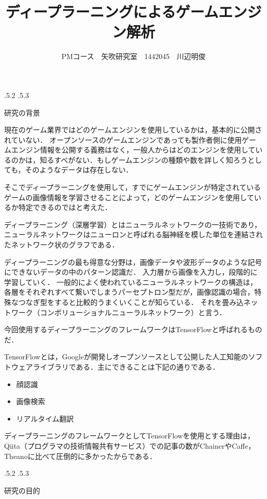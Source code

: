 \documentclass[uplatex]{jsarticle}
\title{\vspace{-14mm}ディープラーニングによるゲームエンジン解析}
\author{PMコース　矢吹研究室　1442045　川辺明俊}
\date{}%
\makeatletter
\renewcommand{\section}{%
    \if@slide\clearpage\fi
    \@startsection{section}{1}{\z@}%
    {\Cvs \@plus.5\Cdp \@minus.2\Cdp}%
    {.5\Cvs \@plus.3\Cdp}%
    {\normalfont\raggedright}}
\makeatother
\begin{document}
\maketitle

\section{研究の背景}

現在のゲーム業界ではどのゲームエンジンを使用しているかは，基本的に公開されていない．
オープンソースのゲームエンジンであっても製作者側に使用ゲームエンジン情報を公開する義務はなく，一般人からはどのエンジンを使用しているのかは，知るすべがない．もしゲームエンジンの種類や数を詳しく知ろうとしても，そのようなデータは存在しない．

そこでディープラーニングを使用して，すでにゲームエンジンが特定されているゲームの画像情報を学習させることによって，どのゲームエンジンを使用しているか特定できるのではと考えた．

ディープラーニング（深層学習）とはニューラルネットワークの一技術であり，ニューラルネットワークはニューロンと呼ばれる脳神経を模した単位を連結されたネットワーク状のグラフである．

ディープラーニングの最も得意な分野は，画像データや波形データのような記号にできないデータの中のパターン認識だ．
入力層から画像を入力し，段階的に学習していく．
一般的によく使われているニューラルネットワークの構造は，各層をそれぞれすべて繋いでしまうパーセプトロン型だが，画像認識の場合，特殊なつなぎ型をすると比較的うまくいくことが知らている．
それを畳み込ネットワーク（コンボリューショナルニューラルネットワーク）と言う\cite{abalab}．

今回使用するディープラーニングのフレームワークはTensorFlowと呼ばれるものだ．

TensorFlowとは，Googleが開発しオープンソースとして公開した人工知能のソフトウェアライブラリである\cite{wiki}．主にできることは下記の通りである．
\begin{itemize} 
\item 顔認識
\item 画像検索
\item リアルタイム翻訳
\end{itemize}

ディープラーニングのフレームワークとしてTensorFlowを使用とする理由は，Qiita（プログラマの技術情報共有サービス）での記事の数がChainerやCaffe，Theanoに比べて圧倒的に多かったからである．

\section{研究の目的}
\end{document}
